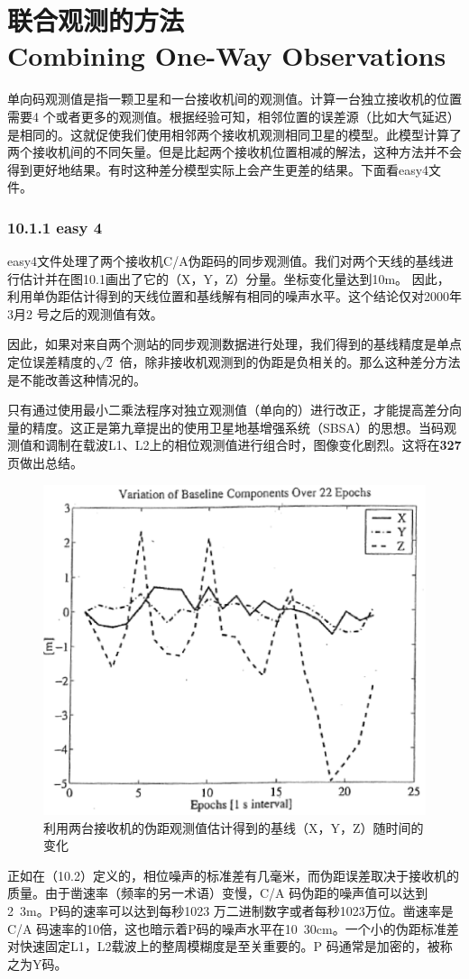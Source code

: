 \section[联合观测的方法]{联合观测的方法\\Combining One-Way Observations}
单向码观测值是指一颗卫星和一台接收机间的观测值。计算一台独立接收机的位置需要4 个或者更多的观测值。根据经验可知，相邻位置的误差源（比如大气延迟）是相同的。这就促使我们使用相邻两个接收机观测相同卫星的模型。此模型计算了两个接收机间的不同矢量。但是比起两个接收机位置相减的解法，这种方法并不会得到更好地结果。有时这种差分模型实际上会产生更差的结果。下面看easy4文件。

\subsubsection{10.1.1 easy 4}

easy4文件处理了两个接收机C/A伪距码的同步观测值。我们对两个天线的基线进行估计并在图10.1画出了它的（X，Y，Z）分量。坐标变化量达到10m。 因此，利用单伪距估计得到的天线位置和基线解有相同的噪声水平。这个结论仅对2000年3月2 号之后的观测值有效。

因此，如果对来自两个测站的同步观测数据进行处理，我们得到的基线精度是单点定位误差精度的$\sqrt{2}$ 倍，除非接收机观测到的伪距是负相关的。那么这种差分方法是不能改善这种情况的。

只有通过使用最小二乘法程序对独立观测值（单向的）进行改正，才能提高差分向量的精度。这正是第九章提出的使用卫星地基增强系统（SBSA）的思想。当码观测值和调制在载波L1、L2上的相位观测值进行组合时，图像变化剧烈。这将在\textbf{327}页做出总结。

\begin{figure}
	\centering
	\includegraphics[width=0.4\linewidth]{TeX_files/Part03/chapter10/image/9-1}
	\caption{利用两台接收机的伪距观测值估计得到的基线（X，Y，Z）随时间的变化}
	\label{fig:9-1}
\end{figure}

正如在（10.2）定义的，相位噪声的标准差有几毫米，而伪距误差取决于接收机的质量。由于凿速率（频率的另一术语）变慢，C/A 码伪距的噪声值可以达到2~3m。P码的速率可以达到每秒1023 万二进制数字或者每秒1023万位。凿速率是C/A 码速率的10倍，这也暗示着P码的噪声水平在10~30cm。一个小的伪距标准差对快速固定L1，L2载波上的整周模糊度是至关重要的。P 码通常是加密的，被称之为Y码。

